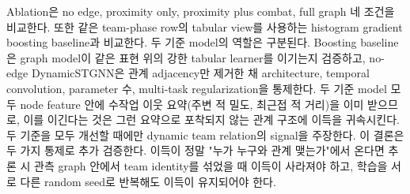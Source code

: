 Ablation은 no edge, proximity only, proximity plus combat, full graph 네
조건을 비교한다. 또한 같은 team-phase row의 tabular view를 사용하는
histogram gradient boosting baseline과 비교한다. 두 기준 model의 역할은
구분된다. Boosting baseline은 graph model이 같은 표현 위의 강한 tabular
learner를 이기는지 검증하고, no-edge DynamicSTGNN은 관계 adjacency만 제거한
채 architecture, temporal convolution, parameter 수, multi-task
regularization을 통제한다. 두 기준 model 모두 node feature 안에 수작업
이웃 요약(주변 적 밀도, 최근접 적 거리)을 이미 받으므로, 이를 이긴다는
것은 그런 요약으로 포착되지 않는 관계 구조에 이득을 귀속시킨다. 두 기준을
모두 개선할 때에만 dynamic team relation의 signal을 주장한다. 이 결론은 두
가지 통제로 추가 검증한다. 이득이 정말 "누가 누구와 관계 맺는가"에서
온다면 추론 시 관측 graph 안에서 team identity를 섞었을 때 이득이 사라져야
하고, 학습을 서로 다른 random seed로 반복해도 이득이 유지되어야 한다.
